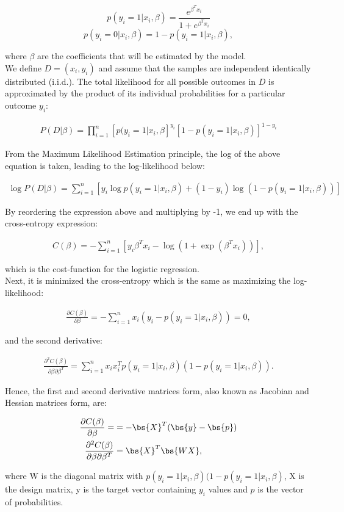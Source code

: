 $$p(y_i=1|x_i, \beta) = \frac{e^{\beta^T x_i}}{1+e^{\beta^T x_i}}$$
$$p(y_i=0|x_i, \beta) = 1 - p(y_i = 1|x_i, \beta),$$

\noindent where $\beta$ are the coefficients that will be estimated by the model.\\

We define $D=(x_i, y_i)$ and assume that the samples are independent identically distributed (i.i.d.). The total likelihood for all possible outcomes in $D$ is approximated by the product of its individual probabilities for a particular outcome $y_i$:

\begin{align*}
P(D|\beta) = \prod_{i=1}^{n} \left[ p(y_i= 1 | x_i, \beta \right]^{y_i} \left[ 1 - p(y_i= 1 | x_i, \beta) \right]^{1 - y_i}
\end{align*}

From the Maximum Likelihood Estimation principle, the log of the above equation is taken, leading to the log-likelihood below:

\begin{align*}
\log P(D|\beta) = \sum_{i=1}^n \left[ y_i \log p(y_i = 1| x_i, \beta) + (1 - y_i)\log(1 - p(y_i = 1 | x_i, \beta))\right]
\end{align*}

By reordering the expression above and multiplying by -1, we end up with the cross-entropy expression:

\begin{align*}
C(\beta) = - \sum_{i=1}^n \left[ y_i\beta^Tx_i - \log(1 + \exp(\beta^Tx_i)) \right],
\end{align*}

\noindent which is the cost-function for the logistic regression.\\

Next, it is minimized the cross-entropy which is the same as maximizing the log-likelihood:

\begin{align*}
\frac{\partial C(\beta)}{\partial \beta} = - \sum_{i=1}^n x_i(y_i - p(y_i=1 | x_i, \beta)) = 0,
\end{align*}

\noindent and the second derivative:

\begin{align*}
\frac{\partial^2 C(\beta)}{\partial \beta \partial \beta^T} = \sum_{i=1}^n x_ix_i^T p(y_i = 1 | x_i, \beta)(1 - p(y_i = 1 | x_i, \beta)).
\end{align*}

Hence, the first and second derivative matrices form, also known as Jacobian and Hessian matrices form, are:

\begin{align*}
\frac{\partial C(\beta)}{\partial \beta} = &= -\bs{X}^T(\bs{y} - \bs{p})\\
\frac{\partial^2 C(\beta)}{\partial \beta \partial \beta^T} &= \bs{X}^T\bs{WX},
\end{align*}

\noindent where W is the diagonal matrix with $p(y_i = 1 | x_i, \beta)(1 - p(y_i = 1 | x_i, \beta)$, X is the design matrix, y is the target vector containing $y_i$ values and $p$ is the vector of probabilities.


